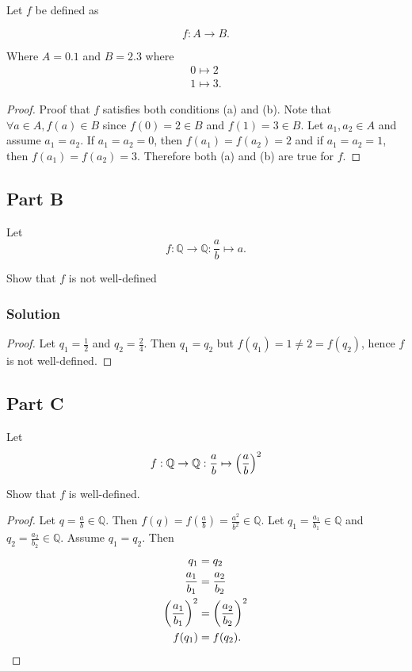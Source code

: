 \documentclass[12pt]{extarticle}
\begin{document}
Let $f$ be defined as

\[
	f: A \rightarrow B
.\]

Where $A = \qty{0,1}$ and $B = \qty{2,3}$ where
\begin{align*}
	0 \mapsto 2 \\
	1 \mapsto 3
.\end{align*}

\begin{proof}
	Proof that $f$ satisfies both conditions (a) and (b). Note that $\forall a \in A, f(a) \in B$ since $f(0) = 2 \in B$ and $f(1) = 3 \in B$. Let $a_1, a_2 \in A$ and assume $a_1 = a_2$. If $a_1 = a_2 = 0$, then $f(a_1) = f(a_2) = 2$ and if $a_1 = a_2 = 1$, then $f(a_1) = f(a_2) = 3$. Therefore both (a) and (b) are true for $f$.
\end{proof}

\subsection*{Part B}

Let
\[
	f: \mathbb{Q} \rightarrow \mathbb{Q} : \frac{a}{b} \mapsto a
.\]

Show that $f$ is not well-defined

\subsubsection*{Solution}

\begin{proof}
	Let $q_1 = \frac{1}{2}$ and $q_2 = \frac{2}{4}$. Then $q_1 = q_2$ but $f(q_1) = 1 \neq 2 =f(q_2)$, hence $f$ is not well-defined.
\end{proof}

\subsection*{Part C}

Let
\[
	f: \mathbb{Q} \rightarrow \mathbb{Q} : \frac{a}{b} \mapsto \qty(\frac{a}{b})^2
\]

Show that $f$ is well-defined.

\begin{proof}
	Let $q = \frac{a}{b} \in \mathbb{Q}$. Then $f(q) = f(\frac{a}{b}) = \frac{a^2}{b^2} \in \mathbb{Q}$. Let $q_1 = \frac{a_1}{b_1} \in \mathbb{Q}$ and $q_2 = \frac{a_2}{b_2} \in \mathbb{Q}$. Assume $q_1 = q_2$. Then
	\begin{align*}
		q_1 &= q_2 \\
		\frac{a_1}{b_1} &= \frac{a_2}{b_2} \\
		\qty(\frac{a_1}{b_1})^2 &= \qty(\frac{a_2}{b_2})^2 \\
		f(q_1) &= f(q_2)
	.\end{align*}
\end{proof}
\end{document}
